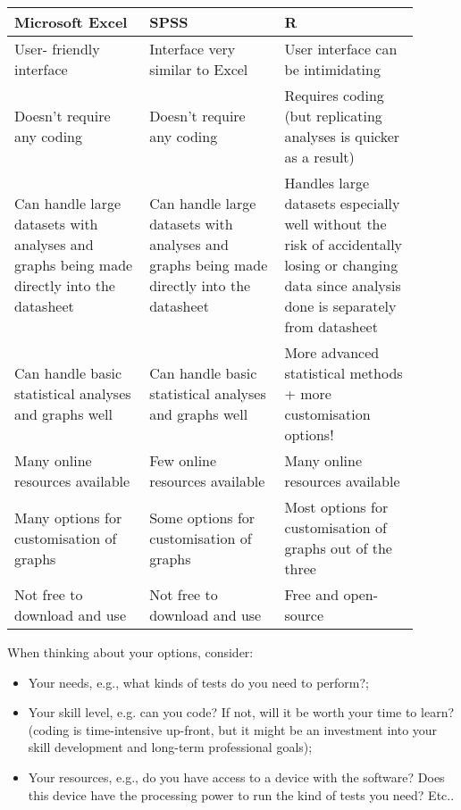 \documentclass{article}
\begin{document}
\begin{table}[hbt!]
\begin{center}
\begin{tabular}{ |>{\centering\arraybackslash}p{0.3\linewidth} |>{\centering\arraybackslash} p{0.3\linewidth}| >{\centering\arraybackslash}p{0.3\linewidth}|} 
 \hline
 \textbf{Microsoft Excel} & \textbf{SPSS} & \textbf{R}\\ 
    \hline
 User- friendly interface & Interface very similar to Excel & User interface can be intimidating\\ 
 \hline
 Doesn’t require any coding & Doesn’t require any coding & Requires coding (but replicating analyses is quicker as a result)\\ 
 \hline
 Can handle large datasets with analyses and graphs being made directly into the datasheet & Can handle large datasets with analyses and graphs being made directly into the datasheet & Handles large datasets especially well without the risk of accidentally losing or changing data since analysis done is separately from datasheet\\
 \hline
 Can handle basic statistical analyses and graphs well & Can handle basic statistical analyses and graphs well & More advanced statistical methods + more customisation options!\\
 \hline
 Many online resources available & Few online resources available & Many online resources available\\
 \hline
 Many options for customisation of graphs & Some options for customisation of graphs & Most options for customisation of graphs out of the three\\
 \hline
 Not free to download and use & Not free to download and use & Free and open-source\\
\hline
\end{tabular}
\end{center}
\end{table}

\newpage
When thinking about your options, consider:

\begin{itemize}
    \item Your needs, e.g., what kinds of tests do you need to perform?;
    
    \item Your skill level, e.g. can you code? If not, will it be worth your time to learn? (coding is time-intensive up-front, but it might be an investment into your skill development and long-term professional goals);
    
    \item Your resources, e.g., do you have access to a device with the software? Does this device have the processing power to run the kind of tests you need? Etc..
\end{itemize}
\end{document}
